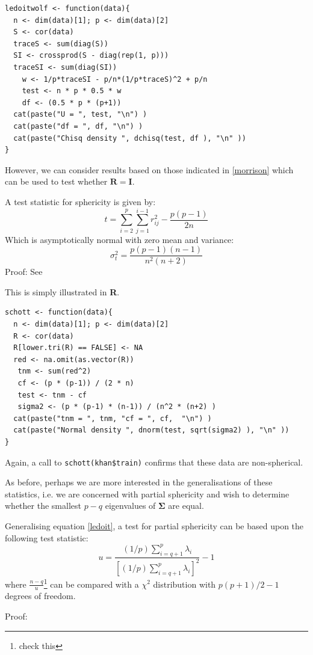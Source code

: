 \singlespacing
\begin{verbatim}
ledoitwolf <- function(data){
  n <- dim(data)[1]; p <- dim(data)[2] 
  S <- cor(data)
  traceS <- sum(diag(S))
  SI <- crossprod(S - diag(rep(1, p)))   
  traceSI <- sum(diag(SI))
    w <- 1/p*traceSI - p/n*(1/p*traceS)^2 + p/n
    test <- n * p * 0.5 * w
    df <- (0.5 * p * (p+1))
  cat(paste("U = ", test, "\n") )
  cat(paste("df = ", df, "\n") )
  cat(paste("Chisq density ", dchisq(test, df ), "\n" ))
}
\end{verbatim}
\onehalfspacing


However, we can consider results based on those indicated in  \ref{morrison} which can be used to test whether $\boldsymbol{R} = \boldsymbol{I}$.  

\begin{theorem}
A test statistic for sphericity is given by:
\begin{displaymath}
t = \sum_{i=2}^{p} \sum_{j=1}^{i-1} r_{ij}^{2} - \frac{p(p-1)}{2n}
\end{displaymath}
Which is asymptotically normal with zero mean and variance:
\begin{displaymath}
\sigma_{t}^{2} = \frac{p(p-1)(n-1)}{n^{2}(n+2)}
\end{displaymath}
Proof: See \cite{Schott:2005}
\end{theorem}


This is simply illustrated in \textbf{R}.

\singlespacing
\begin{verbatim}
schott <- function(data){
  n <- dim(data)[1]; p <- dim(data)[2]
  R <- cor(data)
  R[lower.tri(R) == FALSE] <- NA
  red <- na.omit(as.vector(R))
   tnm <- sum(red^2) 
   cf <- (p * (p-1)) / (2 * n)
   test <- tnm - cf
   sigma2 <- (p * (p-1) * (n-1)) / (n^2 * (n+2) )
  cat(paste("tnm = ", tnm, "cf = ", cf,  "\n") )
  cat(paste("Normal density ", dnorm(test, sqrt(sigma2) ), "\n" ))
}
\end{verbatim}
\onehalfspacing

Again, a call to \verb+schott(khan$train)+ confirms that these data are non-spherical.

As before, perhaps we are more interested in the generalisations of these statistics, i.e. we are concerned with partial sphericity and wish to determine whether the smallest $p-q$ eigenvalues of $\boldsymbol{\Sigma}$ are equal.

\begin{theorem}
Generalising equation \ref{ledoit}, a test for partial sphericity can be based upon the following test statistic:
\begin{equation}
u = \frac{ (1/p) \sum_{i=q+1}^{p} \lambda_{i}}{\left[(1/p) \sum_{i=q+1}^{p} \lambda_{i} \right]^{2}} - 1
\end{equation}
where $\frac{n-q}{u}$\footnote{check this} can be compared with a $\chi^{2}$ distribution with $p(p+1)/2 - 1$ degrees of freedom.     
\end{theorem}
Proof: \cite{Schott:2006}

